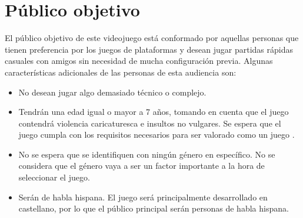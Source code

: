 \section{Público objetivo}%

El público objetivo de este videojuego está conformado por aquellas personas que
tienen preferencia por los juegos de plataformas y desean jugar partidas rápidas
casuales con amigos sin necesidad de mucha configuración previa. Algunas
características adicionales de las personas de esta audiencia son:

\begin{itemize}
    \item No desean jugar algo demasiado técnico o complejo.
    \item Tendrán una edad igual o mayor a 7 años, tomando en cuenta que el
    juego contendrá violencia caricaturesca e insultos no vulgares. Se espera
    que el juego cumpla con los requisitos necesarios para ser valorado como un
    juego .
    \item No se espera que se identifiquen con ningún género en específico. No
    se considera que el género vaya a ser un factor importante a la hora de
    seleccionar el juego.
    \item Serán de habla hispana. El juego será principalmente desarrollado en
    castellano, por lo que el público principal serán personas de habla hispana.
\end{itemize}